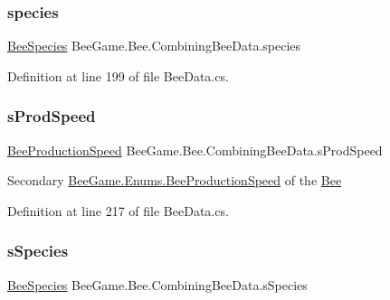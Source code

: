 \subsubsection{\texorpdfstring{species}{species}}
{\footnotesize\ttfamily \hyperlink{namespace_bee_game_1_1_enums_aa2ead984825678d83c42d48f6382619c}{Bee\+Species} Bee\+Game.\+Bee.\+Combining\+Bee\+Data.\+species}



Definition at line 199 of file Bee\+Data.\+cs.

\mbox{\label{struct_bee_game_1_1_bee_1_1_combining_bee_data_a253d2a55fe2cb1a3d01492a6f961b995}} 
\subsubsection{\texorpdfstring{s\+Prod\+Speed}{sProdSpeed}}
{\footnotesize\ttfamily \hyperlink{namespace_bee_game_1_1_enums_afee18200a21cc4b8e1d0cdb669930f14}{Bee\+Production\+Speed} Bee\+Game.\+Bee.\+Combining\+Bee\+Data.\+s\+Prod\+Speed}



Secondary \hyperlink{namespace_bee_game_1_1_enums_afee18200a21cc4b8e1d0cdb669930f14}{Bee\+Game.\+Enums.\+Bee\+Production\+Speed} of the \hyperlink{namespace_bee_game_1_1_bee}{Bee} 



Definition at line 217 of file Bee\+Data.\+cs.

\mbox{\label{struct_bee_game_1_1_bee_1_1_combining_bee_data_a8359d180e7a0704e81bb7f37b9aac021}} 
\subsubsection{\texorpdfstring{s\+Species}{sSpecies}}
{\footnotesize\ttfamily \hyperlink{namespace_bee_game_1_1_enums_aa2ead984825678d83c42d48f6382619c}{Bee\+Species} Bee\+Game.\+Bee.\+Combining\+Bee\+Data.\+s\+Species}



